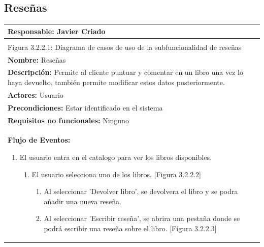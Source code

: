 ﻿\documentclass{report}
\begin{document}
            \subsection{Reseñas}
                \begin{center}
                    \begin{longtable}{|p{\linewidth}|}
                        \hline
                        \textbf{Responsable:} Javier Criado\\
                        \hline
                        \begin{figure}[H]
                            \centering
                            \texttt{[image: ./img/casos\_uso/Reseñas.png]}
                            \\Figura 3.2.2.1: Diagrama de casos de uso de la subfuncionalidad de reseñas
                        \end{figure}\\
                        \hline
                        \textbf{Nombre:} Reseñas\\
                        \hline
                        \textbf{Descripción:} Permite al cliente puntuar y comentar en un libro una vez lo haya devuelto, también permite modificar estos datos posteriormente.\\
                        \hline
                        \textbf{Actores:} Usuario\\
                        \hline
                        \textbf{Precondiciones:} Estar identificado en el sistema\\
                        \hline
                        \textbf{Requisitos no funcionales:} Ninguno\\
                        \hline
                        \textbf{Flujo de Eventos:}
                        \begin{enumerate}
                            \item El usuario entra en el catalogo para ver los libros disponibles.
                            \begin{enumerate}
                                \item El usuario selecciona uno de los libros. [Figura 3.2.2.2]
                                \begin{enumerate}
                                    \item Al seleccionar 'Devolver libro', se devolvera el libro y se podra añadir una nueva reseña.
                                    \item Al seleccionar 'Escribir reseña', se abrira una pestaña donde se podrá escribir una reseña sobre el libro. [Figura 3.2.2.3]

\end{enumerate}
\end{enumerate}
\end{enumerate}
\end{longtable}
\end{center}
\end{document}
